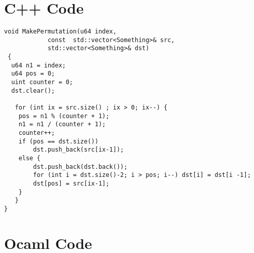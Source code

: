 \documentclass{article} %
\begin{document}
  \section{C++ Code} %
\begin{lstlisting}
void MakePermutation(u64 index,
			const  std::vector<Something>& src, 
			std::vector<Something>& dst)
 {
  u64 n1 = index;
  u64 pos = 0;
  uint counter = 0;
  dst.clear();

   for (int ix = src.size() ; ix > 0; ix--) {
 	pos = n1 % (counter + 1);
	n1 = n1 / (counter + 1);
	counter++;
	if (pos == dst.size())
		dst.push_back(src[ix-1]);
	else {
		dst.push_back(dst.back());
		for (int i = dst.size()-2; i > pos; i--) dst[i] = dst[i -1];
		dst[pos] = src[ix-1];
	}
   }
}
\end{lstlisting}
\newpage

  \section{Ocaml Code} %
\end{document}
